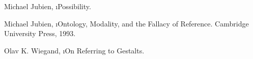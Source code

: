 \begin{thebibliography}{99}

Michael Jubien, \i{Possibility}.

Michael Jubien, \i{Ontology, Modality, and the
Fallacy of Reference}.  Cambridge University Press, 1993.

Olav K. Wiegand, \i{On Referring to Gestalts}.


\end{thebibliography}